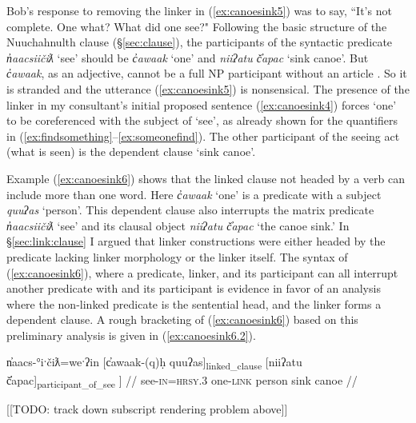Bob's response to removing the linker in (\ref{ex:canoesink5}) was to say, ``It's not complete. One what? What did one see?" Following the basic structure of the Nuuchahnulth clause (\S\ref{sec:clause}), the participants of the syntactic predicate \textit{n̓aacsiičiƛ} `see' should be \textit{c̓awaak} `one' and \textit{niiʔatu č̓apac} `sink canoe'. But \textit{c̓awaak}, as an adjective, cannot be a full NP participant without an article \citep{wojdak2001}. So it is stranded and the utterance (\ref{ex:canoesink5}) is nonsensical. The presence of the linker in my consultant's initial proposed sentence (\ref{ex:canoesink4}) forces `one' to be coreferenced with the subject of `see', as already shown for the quantifiers in (\ref{ex:findsomething}--\ref{ex:someonefind}). The other participant of the seeing act (what is seen) is the dependent clause `sink canoe'.

Example (\ref{ex:canoesink6}) shows that the linked clause not headed by a verb can include more than one word. Here \textit{c̓awaak} `one' is a predicate with a subject \textit{quuʔas} `person'.  This dependent clause also interrupts the matrix predicate \textit{n̓aacsiičiƛ} `see' and its clausal object \textit{niiʔatu č̓apac} `the canoe sink.' In \S\ref{sec:link:clause} I argued that linker constructions were either headed by the predicate lacking linker morphology or the linker itself. The syntax of (\ref{ex:canoesink6}), where a predicate, linker, and its participant can all interrupt another predicate with and its participant is evidence in favor of an analysis where the non-linked predicate is the sentential head, and the linker forms a dependent clause. A rough bracketing of (\ref{ex:canoesink6}) based on this preliminary analysis is given in (\ref{ex:canoesink6.2}).

\ex \label{ex:canoesink6.2}
\begingl
\gla {[}n̓aacs-°iˑčiƛ=weˑʔin {[}c̓awaak-(q)ḥ quuʔas{]\textsubscript{linked\_clause}} {[}niiʔatu č̓apac{]\textsubscript{participant\_of\_see} ]} //
\glb see-\textsc{in}=\textsc{hrsy.3} one-\textsc{link} person sink canoe //
\endgl
\xe

[[TODO: track down subscript rendering problem above]]

